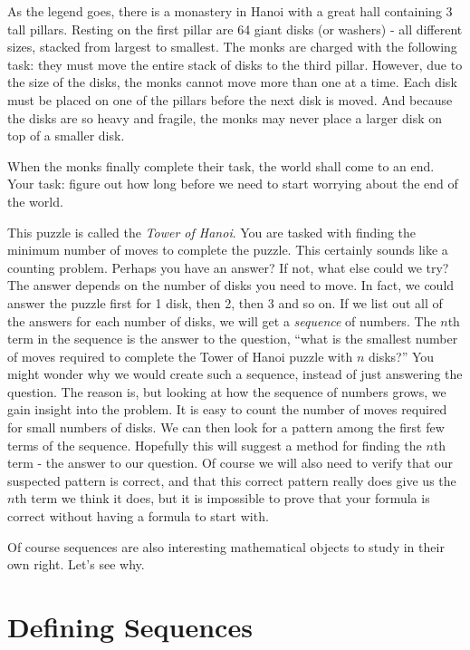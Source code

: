 \documentclass[12pt]{article}
\begin{document}
As the legend goes, there is a monastery in Hanoi with a great hall containing 3 tall pillars.  Resting on the first pillar are 64 giant disks (or washers) - all different sizes, stacked from largest to smallest.  The monks are charged with the following task: they must move the entire stack of disks to the third pillar.  However, due to the size of the disks, the monks cannot move more than one at a time.  Each disk must be placed on one of the pillars before the next disk is moved.  And because the disks are so heavy and fragile, the monks may never place a larger disk on top of a smaller disk.

When the monks finally complete their task, the world shall come to an end.  Your task: figure out how long before we need to start worrying about the end of the world.


This puzzle is called the {\em Tower of Hanoi}.  You are tasked with finding the minimum number of moves to complete the puzzle.  This certainly sounds like a counting problem.  Perhaps you have an answer?  If not, what else could we try?  The answer depends on the number of disks you need to move.  In fact, we could answer the puzzle first for 1 disk, then 2, then 3 and so on.  If we list out all of the answers for each number of disks, we will get a {\em sequence} of numbers.  The $n$th term in the sequence is the answer to the question, ``what is the smallest number of moves required to complete the Tower of Hanoi puzzle with $n$ disks?''  You might wonder why we would create such a sequence, instead of just answering the question.  The reason is, but looking at how the sequence of numbers grows, we gain insight into the problem.  It is easy to count the number of moves required for small numbers of disks.  We can then look for a pattern among the first few terms of the sequence.  Hopefully this will suggest a method for finding the $n$th term - the answer to our question.  Of course we will also need to verify that our suspected pattern is correct, and that this correct pattern really does give us the $n$th term we think it does, but it is impossible to prove that your formula is correct without having a formula to start with.  

Of course sequences are also interesting mathematical objects to study in their own right. Let's see why.


\section{Defining Sequences}
\end{document}
